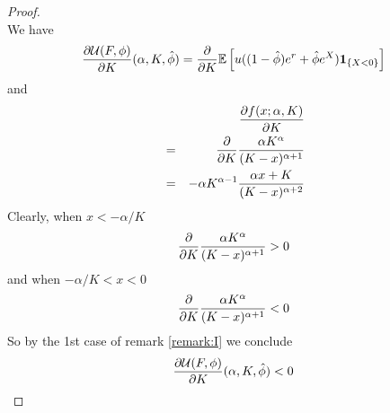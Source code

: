 \documentclass{article}
\begin{document}
\begin{proof}
\[  \]
  We have
  \[
  \frac{\partial \mathcal U(F, \phi)}{\partial K}(\alpha, K, \hat\phi)
  = \frac{\partial}{\partial K} \mathbb{E} \left[
    u((1 - \hat\phi) e^r + \hat\phi e^X) \mathbf{1}_{\{X < 0\}}
  \right] 
  \]
  and
  \begin{eqnarray*}
    && \frac{\partial f(x; \alpha, K)}{\partial K} \\
    &=& \frac{\partial}{\partial K} {\alpha K^\alpha \over (K - x)^{\alpha + 1}} \\
    &=&
    -\alpha K^{\alpha - 1} {
      \alpha x + K
      \over
      (K - x)^{\alpha + 2}
    }
  \end{eqnarray*}
  Clearly, when $x < -\alpha/K$
  \[
  \frac{\partial}{\partial K} {\alpha K^\alpha \over (K - x)^{\alpha + 1}} > 0
  \]
  and when $-\alpha/K < x < 0$
  \[
  \frac{\partial}{\partial K} {\alpha K^\alpha \over (K - x)^{\alpha + 1}} < 0
  \]
  So by the 1st case of remark \ref{remark:I} we conclude
  \[
  \frac{\partial \mathcal U(F, \phi)}{\partial K}(\alpha, K, \hat\phi) < 0  
  \]
\end{proof}



\end{document}
